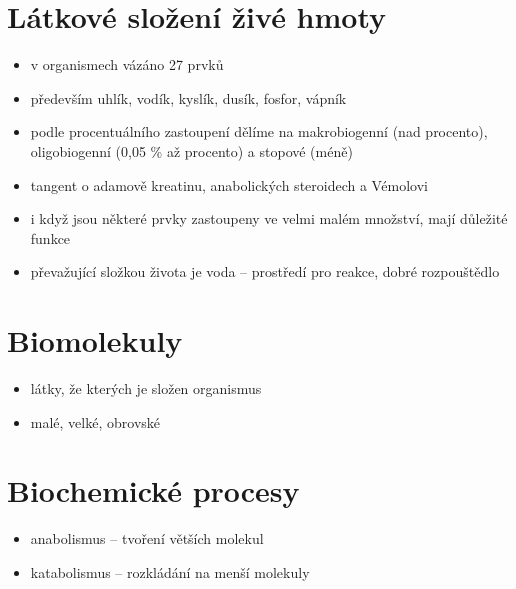 \documentclass{article}
\begin{document}
\section{Látkové složení živé hmoty}
\begin{itemize}
  \item v organismech vázáno 27 prvků
  \item především uhlík, vodík, kyslík, dusík, fosfor, vápník
  \item podle procentuálního zastoupení dělíme na makrobiogenní (nad procento), oligobiogenní (0,05 \% až procento) a stopové (méně)
  \item tangent o adamově kreatinu, anabolických steroidech a Vémolovi
  \item i když jsou některé prvky zastoupeny ve velmi malém množství, mají důležité funkce
  \item převažující složkou života je voda -- prostředí pro reakce, dobré rozpouštědlo
\end{itemize}

\section{Biomolekuly}
\begin{itemize}
  \item látky, že kterých je složen organismus
  \item malé, velké, obrovské
\end{itemize}

\section{Biochemické procesy}
\begin{itemize}
  \item anabolismus -- tvoření větších molekul
  \item katabolismus -- rozkládání na menší molekuly
\end{itemize}
\end{document}
